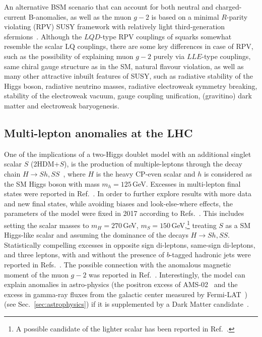 \documentclass[10pt]{article}
\begin{document}
An alternative BSM scenario that can account for both neutral and charged-current B-anomalies, as well as the muon $g-2$ is based on a minimal $R$-parity violating (RPV) SUSY framework with relatively light third-generation sfermions~\cite{Altmannshofer:2017poe, Altmannshofer:2020axr, BhupalDev:2021ipu}. Although the $LQD$-type RPV couplings of squarks somewhat resemble the scalar LQ couplings, there are some key differences in case of RPV, such as the possibility of explaining muon $g-2$ purely via $LLE$-type couplings, same chiral gauge structure as in the SM, natural flavour violation, as well as many other attractive inbuilt features of SUSY, such as radiative stability of the Higgs boson, radiative neutrino masses, radiative electroweak symmetry breaking, stability of the electroweak vacuum, gauge coupling unification,  (gravitino) dark matter and electroweak baryogenesis.  


\subsection{Multi-lepton anomalies at the LHC}
\label{sec:multilepton}
%
\begin{sloppypar}
One of the implications of a two-Higgs doublet model with an additional singlet scalar $S$ (2HDM+$S$), is the production of multiple-leptons through the decay chain $H\rightarrow Sh,SS$~\cite{vonBuddenbrock:2016rmr}, where $H$ is the heavy CP-even scalar and $h$ is considered as the SM Higgs boson with mass $m_h=125$\,GeV. Excesses in multi-lepton final states were reported in Ref.~\cite{vonBuddenbrock:2017gvy}. In order to further explore results with more data and new final states, while avoiding biases and look-else-where effects, the parameters of the model were fixed in 2017 according to Refs.~\cite{vonBuddenbrock:2016rmr,vonBuddenbrock:2017gvy}. This includes setting the scalar masses to $m_H=270$\,GeV, $m_S=150$\,GeV,\footnote{A possible candidate of the lighter scalar has been reported in Ref.~\cite{Crivellin:2021ubm}.} treating $S$ as a SM Higgs-like scalar and assuming the dominance of the decays $H\rightarrow Sh,SS$. Statistically compelling excesses in opposite sign di-leptons, same-sign di-leptons, and three leptons, with and without the presence of $b$-tagged hadronic jets were reported in Refs.~\cite{vonBuddenbrock:2019ajh,vonBuddenbrock:2020ter,Hernandez:2019geu}. The possible connection with the anomalous magnetic moment of the muon $g-2$ was reported in Ref.~\cite{Sabatta:2019nfg}. Interestingly, the model can explain anomalies in astro-physics (the positron excess of AMS-02~\cite{AMS:2019rhg} and the excess in gamma-ray fluxes from the galactic center measured by Fermi-LAT~\cite{Fermi-LAT:2017opo}) (see Sec.~\ref{sec:astrophysics}) if it is supplemented by a Dark Matter candidate~\cite{Beck:2021xsv}.
\end{sloppypar}
\end{document}
